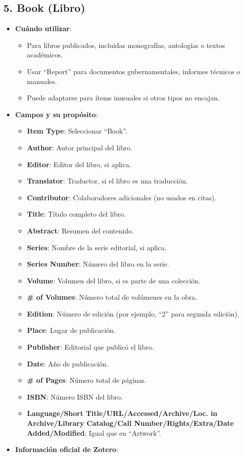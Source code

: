 \documentclass[
  jou,
  floatsintext,
  longtable,
  a4paper,
  nolmodern,
  notxfonts,
  notimes,
  colorlinks=true,linkcolor=blue,citecolor=blue,urlcolor=blue]{apa7}
\providecommand{\tightlist}{%
  \setlength{\itemsep}{0pt}\setlength{\parskip}{0pt}}
\begin{document}
\subsection{5. Book (Libro)}\label{book-libro}

\begin{itemize}
\tightlist
\item
  \textbf{Cuándo utilizar}:

  \begin{itemize}
  \tightlist
  \item
    Para libros publicados, incluidas monografías, antologías o textos
    académicos.
  \item
    Usar ``Report'' para documentos gubernamentales, informes técnicos o
    manuales.
  \item
    Puede adaptarse para ítems inusuales si otros tipos no encajan.
  \end{itemize}
\item
  \textbf{Campos y su propósito}:

  \begin{itemize}
  \tightlist
  \item
    \textbf{Item Type}: Seleccionar ``Book''.
  \item
    \textbf{Author}: Autor principal del libro.
  \item
    \textbf{Editor}: Editor del libro, si aplica.
  \item
    \textbf{Translator}: Traductor, si el libro es una traducción.
  \item
    \textbf{Contributor}: Colaboradores adicionales (no usados en
    citas).
  \item
    \textbf{Title}: Título completo del libro.
  \item
    \textbf{Abstract}: Resumen del contenido.
  \item
    \textbf{Series}: Nombre de la serie editorial, si aplica.
  \item
    \textbf{Series Number}: Número del libro en la serie.
  \item
    \textbf{Volume}: Volumen del libro, si es parte de una colección.
  \item
    \textbf{\# of Volumes}: Número total de volúmenes en la obra.
  \item
    \textbf{Edition}: Número de edición (por ejemplo, ``2'' para segunda
    edición).
  \item
    \textbf{Place}: Lugar de publicación.
  \item
    \textbf{Publisher}: Editorial que publicó el libro.
  \item
    \textbf{Date}: Año de publicación.
  \item
    \textbf{\# of Pages}: Número total de páginas.
  \item
    \textbf{ISBN}: Número ISBN del libro.
  \item
    \textbf{Language/Short Title/URL/Accessed/Archive/Loc. in
    Archive/Library Catalog/Call Number/Rights/Extra/Date
    Added/Modified}: Igual que en ``Artwork''.
  \end{itemize}
\item
  \textbf{Información oficial de Zotero}:


\end{itemize}
\end{document}
